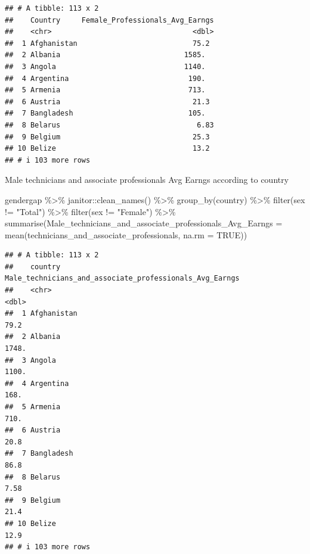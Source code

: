 \documentclass[
]{article}
\newenvironment{Shaded}{\begin{snugshade}}{\end{snugshade}}
\newcommand{\AttributeTok}[1]{\textcolor[rgb]{0.77,0.63,0.00}{#1}}
\newcommand{\ConstantTok}[1]{\textcolor[rgb]{0.00,0.00,0.00}{#1}}
\newcommand{\FunctionTok}[1]{\textcolor[rgb]{0.00,0.00,0.00}{#1}}
\newcommand{\NormalTok}[1]{#1}
\newcommand{\SpecialCharTok}[1]{\textcolor[rgb]{0.00,0.00,0.00}{#1}}
\newcommand{\StringTok}[1]{\textcolor[rgb]{0.31,0.60,0.02}{#1}}
\begin{document}
\begin{verbatim}
## # A tibble: 113 x 2
##    Country     Female_Professionals_Avg_Earngs
##    <chr>                                 <dbl>
##  1 Afghanistan                           75.2 
##  2 Albania                             1585.  
##  3 Angola                              1140.  
##  4 Argentina                            190.  
##  5 Armenia                              713.  
##  6 Austria                               21.3 
##  7 Bangladesh                           105.  
##  8 Belarus                                6.83
##  9 Belgium                               25.3 
## 10 Belize                                13.2 
## # i 103 more rows
\end{verbatim}

Male technicians and associate professionals Avg Earngs according to
country

\begin{Shaded}
\begin{Highlighting}[]
\NormalTok{gendergap }\SpecialCharTok{\%\textgreater{}\%}
\NormalTok{  janitor}\SpecialCharTok{::}\FunctionTok{clean\_names}\NormalTok{() }\SpecialCharTok{\%\textgreater{}\%}
  \FunctionTok{group\_by}\NormalTok{(country) }\SpecialCharTok{\%\textgreater{}\%} 
  \FunctionTok{filter}\NormalTok{(sex }\SpecialCharTok{!=} \StringTok{"Total"}\NormalTok{) }\SpecialCharTok{\%\textgreater{}\%}
  \FunctionTok{filter}\NormalTok{(sex }\SpecialCharTok{!=} \StringTok{"Female"}\NormalTok{) }\SpecialCharTok{\%\textgreater{}\%}
  \FunctionTok{summarise}\NormalTok{(}\AttributeTok{Male\_technicians\_and\_associate\_professionals\_Avg\_Earngs =} \FunctionTok{mean}\NormalTok{(technicians\_and\_associate\_professionals, }\AttributeTok{na.rm =} \ConstantTok{TRUE}\NormalTok{))}
\end{Highlighting}
\end{Shaded}

\begin{verbatim}
## # A tibble: 113 x 2
##    country     Male_technicians_and_associate_professionals_Avg_Earngs
##    <chr>                                                         <dbl>
##  1 Afghanistan                                                   79.2 
##  2 Albania                                                     1748.  
##  3 Angola                                                      1100.  
##  4 Argentina                                                    168.  
##  5 Armenia                                                      710.  
##  6 Austria                                                       20.8 
##  7 Bangladesh                                                    86.8 
##  8 Belarus                                                        7.58
##  9 Belgium                                                       21.4 
## 10 Belize                                                        12.9 
## # i 103 more rows
\end{verbatim}
\end{document}
